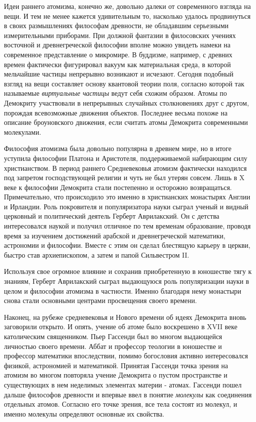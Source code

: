 Идеи раннего атомизма, конечно же, довольно далеки от современного взгляда на вещи.
И тем не менее кажется удивительным то, насколько удалось продвинуться в своих размышлениях философам древности, не обладавшим серьезными измерительными приборами.
При должной фантазии в филосовских учениях восточной и древнегреческой философии вполне можно увидеть намеки на современное представление о микромире.
В буддизме, например, с древних времен фактически фигурировал вакуум как материальная среда, в которой мельчайшие частицы непрерывно возникают и исчезают. 
Сегодня подобный взгляд на вещи составляет основу квантовой теории поля, согласно которой так называемые \textit{виртуальные частицы} ведут себя схожим образом. 
Атомы по Демокриту участвовали в непрерывных случайных столкновениях друг с другом, порождая всевозможные движения объектов. 
Последнее весьма похоже на описание броуновского движения, если считать атомы Демокрита современными молекулами.

Философия атомизма была довольно популярна в древнем мире, но в итоге уступила философии Платона и Аристотеля, поддерживаемой набирающим силу христианством.
В период раннего Средневековья атомизм фактически находился под запретом господствующей религии и чуть не был утерян совсем.
Лишь в X веке к философии Демокрита стали постепенно и осторожно возвращаться.
Примечательно, что происходило это именно в христианских монастырях Англии и Ирландии.
Роль покровителя и популяризатора науки сыграл ученый и видный церковный и политический деятель Герберт Аврилакский.
Он с детства интересовался наукой и получил отличное по тем временам образование, проводя время за изучением достижений арабской и древнегреческой математики, астрономии и философии.
Вместе с этим он сделал блестящую карьеру в церкви, быстро став архиепископом, а затем и папой Сильвестром II.

Используя свое огромное влияние и сохранив приобретенную в юношестве тягу к знаниям, Герберт Аврилакский сыграл выдающуюся роль популяризации науки в целом и философии атомизма в частности.
Именно благодаря нему монастыри снова стали основными центрами просвещения своего времени.

Наконец, на рубеже средневековья и Нового времени об идеях Демокрита вновь заговорили открыто.
И опять, учение об атоме было воскрешено в XVII веке католическим священником. 
Пьер Гассенди был во многом выдающейся личностью своего времени. 
Аббат и профессор теологии в юношестве и профессор математики впоследствии, помимо богословия активно интересовался физикой, астрономией и математикой. 
Принятая Гассенди точка зрения на атомизм во многом повторяла учение Демокрита о пустом пространстве и существующих в нем неделимых элементах материи - атомах. 
Гассенди пошел дальше философов древности и впервые ввел в понятие \textit{молекулы} как соединения отдельных атомов. 
Согласно его точке зрения, все тела состоят из молекул, и именно молекулы определяют основные их свойства. 

